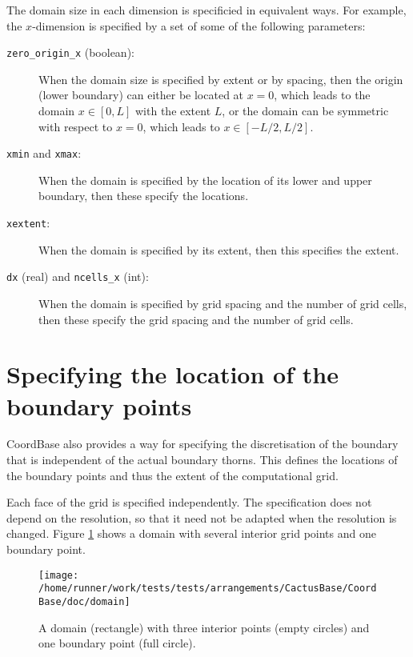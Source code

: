 The domain size in each dimension is specificied in equivalent ways.
For example, the $x$-dimension is specified by a set of some of the
following parameters:
\begin{description}
\item[{\texttt{zero\_origin\_x}} (boolean):]
When the domain size is specified by extent or by spacing, then the
origin (lower boundary) can either be located at $x=0$, which leads to
the domain $x \in [0,L]$ with the extent $L$, or the domain can be
symmetric with respect to $x=0$, which leads to $x \in [-L/2,L/2]$.
\item[{\texttt{xmin}} and {\texttt{xmax}}:]
When the domain is specified by the location of its lower and upper
boundary, then these specify the locations.
\item[{\texttt{xextent}}:]
When the domain is specified by its extent, then this specifies the
extent.
\item[{\texttt{dx}} (real) and {\texttt{ncells\_x}} (int):]
When the domain is specified by grid spacing and the number of grid
cells, then these specify the grid spacing and the number of grid
cells.
\end{description}


\section{Specifying the location of the boundary points}
\label{CactusBase:CoordBase:boundary}

CoordBase also provides a way for specifying the discretisation of the
boundary that is independent of the actual boundary thorns.  This
defines the locations of the boundary points and thus the extent of
the computational grid.

Each face of the grid is specified independently.  The specification
does not depend on the resolution, so that it need not be adapted when
the resolution is changed.  Figure
{\ref{CactusBase:CoordBase:fig-domain}} shows a domain with several
interior grid points and one boundary point.

\begin{figure}
\begin{center}
\texttt{[image: /home/runner/work/tests/tests/arrangements/CactusBase/CoordBase/doc/domain]}
\end{center}
\caption{A domain (rectangle) with three interior points (empty
circles) and one boundary point (full circle).}
\label{CactusBase:CoordBase:fig-domain}
\end{figure}

